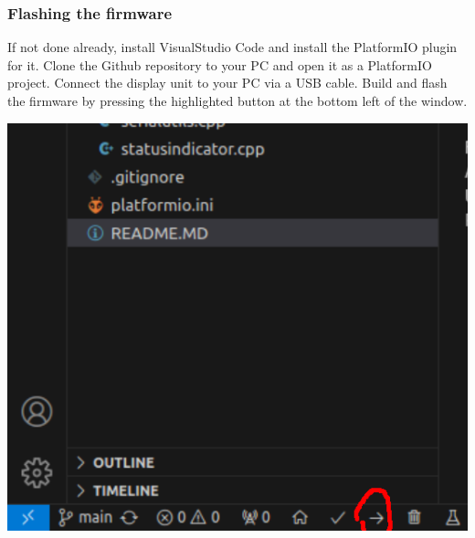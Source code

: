 \documentclass[]{article}
\begin{document}
\subsubsection{Flashing the firmware}
\begin{minipage}[t]{0.5\linewidth}
	\vspace{0pt}
	If not done already, install VisualStudio Code and install the PlatformIO plugin for it. Clone the Github repository to your PC and open it as a PlatformIO project. Connect the display unit to your PC via a USB cable. Build and flash the firmware by pressing the highlighted button at the bottom left of the window.
\end{minipage}
\hfill
\begin{minipage}[t]{0.4\linewidth}
	\vspace{0pt}
	\includegraphics[width=\linewidth]{images/01_displayunit/22_build_and_upload.png}
\end{minipage}
\end{document}
